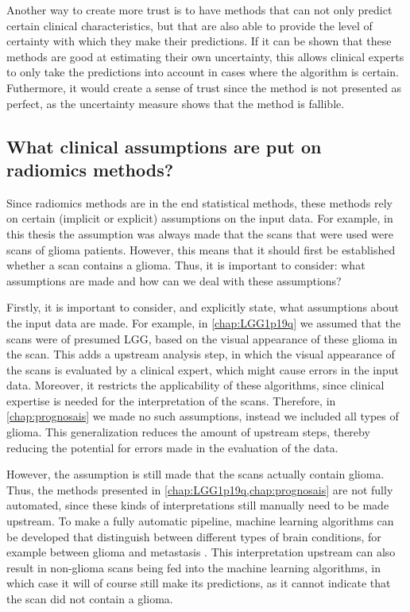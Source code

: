 Another way to create more trust is to have methods that can not only predict certain clinical characteristics, but that are also able to provide the level of certainty with which they make their predictions.
If it can be shown that these methods are good at estimating their own uncertainty, this allows clinical experts to only take the predictions into account in cases where the algorithm is certain.
Futhermore, it would create a sense of trust since the method is not presented as perfect, as the uncertainty measure shows that the method is fallible.

\subsection{What clinical assumptions are put on radiomics methods?}

Since radiomics methods are in the end statistical methods, these methods rely on certain (implicit or explicit) assumptions on the input data.
For example, in this thesis the assumption was always made that the scans that were used were scans of glioma patients.
However, this means that it should first be established whether a scan contains a glioma.
Thus, it is important to consider: what assumptions are made and how can we deal with these assumptions?

Firstly, it is important to consider, and explicitly state, what assumptions about the input data are made.
For example, in \cref{chap:LGG1p19q} we assumed that the scans were of presumed \gls{LGG}, based on the visual appearance of these glioma in the scan.
This adds a upstream analysis step, in which the visual appearance of the scans is evaluated by a clinical expert, which might cause errors in the input data.
Moreover, it restricts the applicability of these algorithms, since clinical expertise is needed for the interpretation of the scans.
Therefore, in \cref{chap:prognosais} we made no such assumptions, instead we included all types of glioma.
This generalization reduces the amount of upstream steps, thereby reducing the potential for errors made in the evaluation of the data.

However, the assumption is still made that the scans actually contain glioma.
Thus, the methods presented in \cref{chap:LGG1p19q,chap:prognosais} are not fully automated, since these kinds of interpretations still manually need to be made upstream.
To make a fully automatic pipeline, machine learning algorithms can be developed that distinguish between different types of brain conditions, for example between glioma and metastasis \autocite{chen2019metastatic}.
This interpretation upstream can also result in non-glioma scans being fed into the machine learning algorithms, in which case it will of course still make its predictions, as it cannot indicate that the scan did not contain a glioma.

